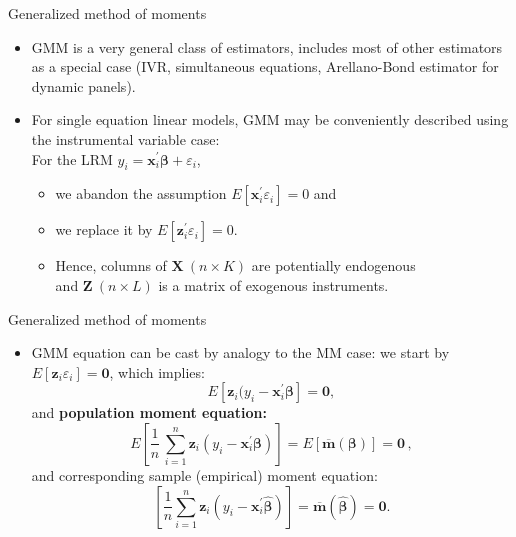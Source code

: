 \documentclass{beamer}
\begin{document}
\begin{frame}{Generalized method of moments}
\begin{itemize}
    \item GMM is a very general class of estimators, includes most of other estimators as a special case (IVR, simultaneous equations, Arellano-Bond estimator for dynamic panels). 
    \medskip
    \item For single equation linear models, GMM may be conveniently described using the instrumental variable case:\\ \bigskip For the LRM $y_i = \bm{x}_i^{\prime}\bm{\beta} + \varepsilon_i$, 
    \begin{itemize}
    \medskip
        \item  we abandon the assumption $E[\bm{x}_i^{\prime} \varepsilon_i]=0$ and
        \medskip
        \item we replace it by $E[\bm{z}_i^{\prime} \varepsilon_i]=0$.
        \medskip
        \item Hence, columns of $\bm{X}~(n\!\times\!K)$ are potentially endogenous \\ \medskip and $\bm{Z}~(n\!\times\!L)$ is a matrix of exogenous instruments.
    \end{itemize}
\end{itemize}
\end{frame}
\begin{frame}{Generalized method of moments}
\begin{itemize}
\item GMM equation can be cast by analogy to the MM case: we start by $E[\bm{z}_i \varepsilon_i]=\bm{0}$, which implies: $$E[\bm{z}_i(y_i-\bm{x}_i^{\prime}\bm{\beta}]=\bm{0},$$ 
and \textbf{population moment equation:}
$$
E \left[ \frac{1}{n} \, \sum_{i=1}^n \bm{z}_i (y_i - \bm{x}_i^{\prime}\bm{\beta}) \right] 
= E \left[ \overline{\mathbf{m}}(\bm{\beta}) \right] = \bm{0}\,,
$$
and corresponding sample (empirical) moment equation:
$$
\left[ \frac{1}{n} \sum_{i=1}^n \bm{z}_i (y_i - \bm{x}_i^{\prime}\hat{\bm{\beta}}) \right]
= \overline{\mathbf{m}}(\hat{\bm{\beta}}) = \bm{0}.
$$
\end{itemize}

\end{frame}
\end{document}

